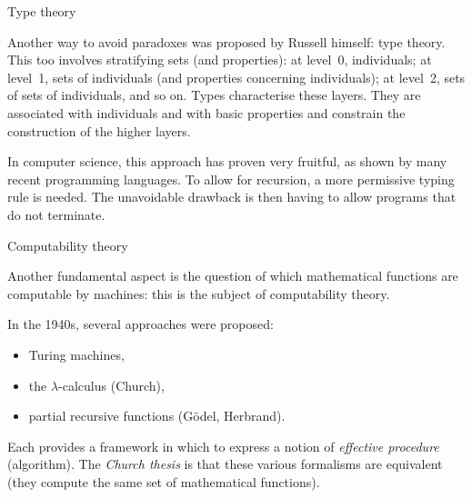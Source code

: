 \documentclass[compress,dvips,xcolor={dvipsnames},t]{beamer}
\begin{document}
%
\begin{frame}{Type theory}

Another way to avoid paradoxes was proposed by Russell himself: type
theory. This too involves stratifying sets (and properties): at
level~0, individuals; at level~1, sets of individuals (and
properties concerning individuals); at level~2, sets of sets of
individuals, and so on. Types characterise these layers. They are
associated with individuals and with basic properties and constrain
the construction of the higher layers.

\bigskip

In computer science, this approach has proven very fruitful, as
shown by many recent programming languages. To allow for recursion,
a more permissive typing rule is needed. The unavoidable drawback is
then having to allow programs that do not terminate.

\end{frame}

%
\begin{frame}{Computability theory}

Another fundamental aspect is the question of which mathematical
functions are computable by machines: this is the subject of
computability theory.

\bigskip

In the 1940s, several approaches were proposed:
\begin{itemize}

  \item Turing machines,

  \item the $\lambda$-calculus (Church),

  \item partial recursive functions (Gödel, Herbrand).

\end{itemize}
Each provides a framework in which to express a notion of
\emph{effective procedure} (algorithm). The \emph{Church thesis} is
that these various formalisms are equivalent (they compute the same
set of mathematical functions).

\end{frame}
\end{document}
